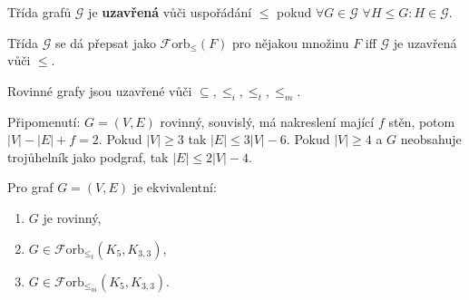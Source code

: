 \begin{definice}
	Třída grafů $\mathcal{G}$ je \textbf{uzavřená} vůči uspořádání $\leq$ pokud $\forall G \in \mathcal{G}$ $\forall H \leq G: H \in \mathcal{G}$.
\end{definice}

\begin{pozor}
	Třída $\mathcal{G}$ se dá přepsat jako $\mathcal{F}\text{orb}_{\leq}(F)$ pro nějakou množinu $F$ iff $\mathcal{G}$ je uzavřená vůči $\leq$.
\end{pozor}

\begin{fakt}
	Rovinné grafy jsou uzavřené vůči $\subseteq, \leq_{i}, \leq_{t}, \leq_{m}$.
\end{fakt}

Připomenutí: $G = (V,E)$ rovinný, souvislý, má nakreslení mající $f$ stěn, potom $|V|-|E| + f = 2$. Pokud $|V| \geq 3$ tak $|E| \leq 3|V| - 6$. Pokud $|V| \geq 4$ a $G$ neobsahuje trojůhelník jako podgraf, tak $|E| \leq 2|V| - 4$.

\begin{veta}
	Pro graf $G = (V,E)$ je ekvivalentní:
	
	\begin{enumerate}
		\item $G$ je rovinný,
		\item $G \in \mathcal{F}\text{orb}_{\leq_{t}}(K_{5},K_{3,3})$,
		\item $G \in \mathcal{F}\text{orb}_{\leq_{m}}(K_{5},K_{3,3})$.
	\end{enumerate}
\end{veta}

